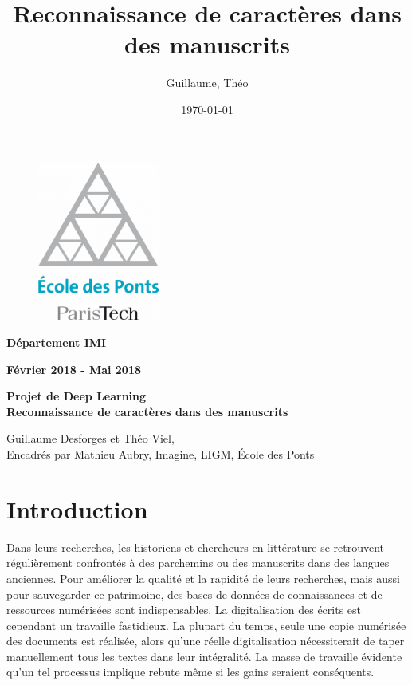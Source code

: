 \documentclass{report}
\title{Reconnaissance de caractères dans des manuscrits}
\date{\today}
\author{\bsc{Desforges} Guillaume, \bsc{Viel} Théo}
\begin{document}
\thispagestyle{empty}
\begin{center}

    \begin{figure}[!htb]
        \begin{center}
            \includegraphics[width=4cm]{img/logo_enpc.png}
        \end{center}
    \end{figure}

    \vspace{0.5cm}

    {\large{\bf Département IMI}}

    \vspace{0.2cm}

    {\large{\bf Février 2018 - Mai 2018}}

    \vspace{1.5cm}

    \large{ \bf Projet de Deep Learning}\\
    \vspace{0.2cm}
    {\Large{\bf Reconnaissance de caractères dans des manuscrits}}

    \vspace{1cm}

    \large{Guillaume Desforges et Théo Viel},\\
    \vspace{0.2cm}
    \large{Encadrés par Mathieu Aubry, Imagine, LIGM, École des Ponts}

\end{center}
\newpage

\chapter*{Introduction}

Dans leurs recherches, les historiens et chercheurs en littérature se retrouvent régulièrement confrontés à des parchemins ou des manuscrits dans des langues anciennes.
Pour améliorer la qualité et la rapidité de leurs recherches, mais aussi pour sauvegarder ce patrimoine, des bases de données de connaissances et de ressources numérisées sont indispensables.
La digitalisation des écrits est cependant un travaille fastidieux.
La plupart du temps, seule une copie numérisée des documents est réalisée, alors qu'une réelle digitalisation nécessiterait de taper manuellement tous les textes dans leur intégralité.
La masse de travaille évidente qu'un tel processus implique rebute même si les gains seraient conséquents.
\end{document}
